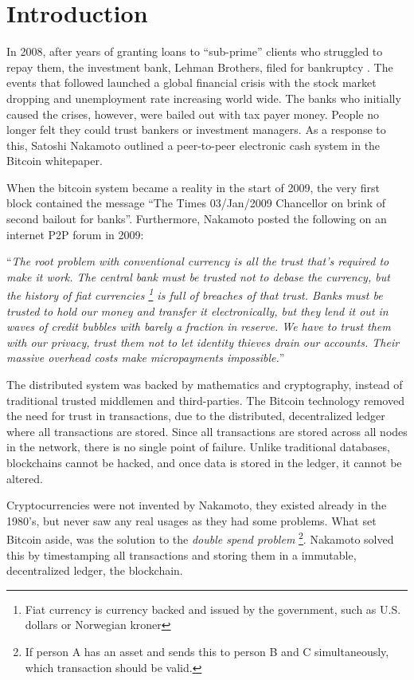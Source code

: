 \chapter{Introduction}
In 2008, after years of granting loans to \enquote{sub-prime} clients who struggled to repay them, the investment bank, Lehman Brothers, filed for bankruptcy \cite{lehman}. The events that followed launched a global financial crisis with the stock market dropping and unemployment rate increasing world wide. The banks who initially caused the crises, however, were bailed out with tax payer money. People no longer felt they could trust bankers or investment managers. As a response to this, Satoshi Nakamoto outlined a peer-to-peer electronic cash system in the Bitcoin whitepaper. 

When the bitcoin system became a reality in the start of 2009, the very first block contained the message \enquote{The Times 03/Jan/2009 Chancellor on brink of second bailout for banks}. Furthermore, Nakamoto posted the following on an internet P2P forum \cite{nakamoto_trust} in 2009: 

\enquote{\textit{The root problem with conventional currency is all the trust that's required to make it work. The central bank must be trusted not to debase the currency, but the history of fiat currencies \footnote{Fiat currency is currency backed and issued by the government, such as U.S. dollars or Norwegian kroner} is full of breaches of that trust. Banks must be trusted to hold our money and transfer it electronically, but they lend it out in waves of credit bubbles with barely a fraction in reserve. We have to trust them with our privacy, trust them not to let identity thieves drain our accounts. Their massive overhead costs make micropayments impossible.}}

The distributed system was backed by mathematics and cryptography, instead of traditional trusted middlemen and third-parties. The Bitcoin technology removed the need for trust in transactions, due to the distributed, decentralized ledger where all transactions are stored. Since all transactions are stored across all nodes in the network, there is no single point of failure. Unlike traditional databases, blockchains cannot be hacked, and once data is stored in the ledger, it cannot be altered.

Cryptocurrencies were not invented by Nakamoto, they existed already in the 1980's, but never saw any real usages as they had some problems. What set Bitcoin aside, was the solution to the \textit{double spend problem} \footnote{If person A has an asset and sends this to person B and C simultaneously, which transaction should be valid.}. Nakamoto solved this by timestamping all transactions and storing them in a immutable, decentralized ledger, the blockchain.

